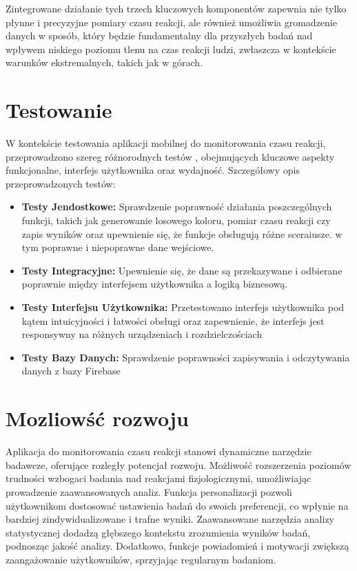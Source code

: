 Zintegrowane działanie tych trzech kluczowych komponentów zapewnia nie tylko płynne i precyzyjne pomiary czasu reakcji, ale również umożliwia gromadzenie danych w sposób, który będzie fundamentalny dla przyszłych badań nad wpływem niskiego poziomu tlenu na czas reakcji ludzi, zwłaszcza w kontekście warunków ekstremalnych, takich jak w górach.
\section{Testowanie}
W kontekście testowania aplikacji mobilnej do monitorowania czasu reakcji, przeprowadzono szereg różnorodnych testów \cite{testy}, obejmujących kluczowe aspekty funkcjonalne, interfejs użytkownika oraz wydajność. Szczegółowy opis przeprowadzonych testów:
\begin{itemize}
    \item \textbf{Testy Jendostkowe: } Sprawdzenie poprawność działania poszczególnych funkcji, takich jak generowanie losowego koloru, pomiar czasu reakcji czy zapis wyników oraz upewnienie się, że funkcje obsługują różne sceraiusze. w tym poprawne i niepoprawne dane wejściowe.
    \item \textbf{Testy Integracyjne: } Upewnienie się, że dane są przekazywane i odbierane poprawnie między interfejsem użytkownika a logiką biznesową.
    \item \textbf{ Testy Interfejsu Użytkownika: } Przetestowano interfejs użytkownika pod kątem intuicyjności i łatwości obsługi oraz zapewnienie, że interfejs jest responsywny na różnych urządzeniach i rozdzielczościach
    \item \textbf{Testy Bazy Danych: } Sprawdzenie poprawności zapisywania i odczytywania danych z bazy Firebase
\end{itemize}
\section{Mozliowść rozwoju}
Aplikacja do monitorowania czasu reakcji stanowi dynamiczne narzędzie badawcze, oferujące rozległy potencjał rozwoju. Możliwość rozszerzenia poziomów trudności wzbogaci badania nad reakcjami fizjologicznymi, umożliwiając prowadzenie zaawansowanych analiz. Funkcja personalizacji pozwoli użytkownikom dostosować ustawienia badań do swoich preferencji, co wpłynie na bardziej zindywidualizowane i trafne wyniki. Zaawansowane narzędzia analizy statystycznej dodadzą głębszego kontekstu zrozumienia wyników badań, podnosząc jakość analizy. Dodatkowo, funkcje powiadomień i motywacji zwiększą zaangażowanie użytkowników, sprzyjając regularnym badaniom.

